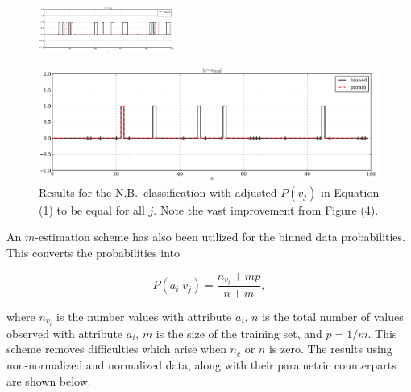 \begin{multicols}{2}
\begin{figure}[H]
  \centering
		\includegraphics[width=0.4\textwidth]{images/normed_new_results.png}
\end{figure}

\end{multicols}

\newpage

\begin{figure}[H]
  \centering
		\includegraphics[width=1.0\textwidth]{images/normed_new_results_fixed_prob.png}
  \caption{\scriptsize Results for the N.B.\ classification with adjusted $P(v_j)$ in Equation (1) to be equal for all $j$.  Note the vast improvement from Figure (4).}
\end{figure}

An $m$-estimation scheme has also been utilized for the binned data probabilities.  This converts the probabilities into

$$P(a_i | v_j) = \frac{n_{v_i} + mp}{n + m},$$

where $n_{v_i}$ is the number values with attribute $a_i$, $n$ is the total number of values observed with attribute $a_i$, $m$ is the size of the training set, and $p=1/m$.  This scheme removes difficulties which arise when $n_c$ or $n$ is zero.  The results using non-normalized and normalized data, along with their parametric counterparts are shown below.

